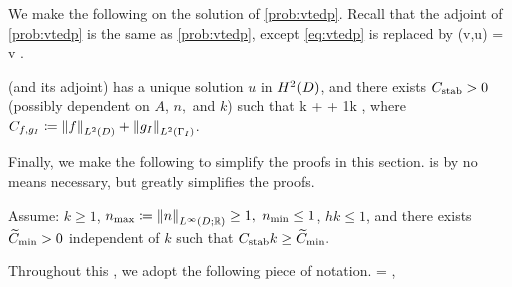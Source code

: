 We make the following  on the solution of \cref{prob:vtedp}. Recall that the adjoint of \cref{prob:vtedp} is the same as \cref{prob:vtedp}, except \cref{eq:vtedp} is replaced by
\beq\label{eq:adjoint}
\aT(v,u) =  \tforall v \in \HozDD.
\eeq

\bas\label{ass:htwo}
 (and its adjoint) has a unique solution $u$ in $\HtD$, and there exists $C_{\mathrm{stab}}>0$ (possibly dependent on $A$, $n,$ and $k$) such that
\beq\label{eq:generalhtwo}
k  +  + \frac1k  \leq \CAnk \Cfg,
\eeq
where $\Cfg \de \NLtD{f} + \NLtGI{\gI}$.
\eas

Finally, we make the following  to simplify the proofs in this section.  is by no means necessary, but greatly simplifies the proofs.

\label{ass:convenient}
Assume: $k \geq 1$, $\nmax \de \NLiDRR{n} \geq 1,$ $n_{\min} \leq 1$, $hk \leq 1$, and there exists $\widetilde{C}_{\min} > 0$ independent of $k$ such that $C_{\mathrm{stab}} k \geq \widetilde{C}_{\min}.$
\eas

Throughout this , we adopt the following piece of notation.
\beqs
\nvar = \frac{\nmax}{\nmin},
\eeqs

